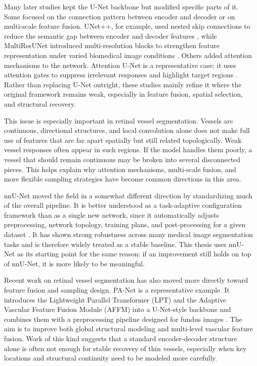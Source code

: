 \documentclass[a4paper,11pt]{article}
\begin{document}
Many later studies kept the U-Net backbone but modified specific parts of it. Some focused on the connection pattern between encoder and decoder or on multi-scale feature fusion. UNet++, for example, used nested skip connections to reduce the semantic gap between encoder and decoder features \cite{zhou2018unetpp}, while MultiResUNet introduced multi-resolution blocks to strengthen feature representation under varied biomedical image conditions \cite{ibtehaz2020multiresunet}. Others added attention mechanisms to the network. Attention U-Net is a representative case; it uses attention gates to suppress irrelevant responses and highlight target regions \cite{oktay2018attentionunet}. Rather than replacing U-Net outright, these studies mainly refine it where the original framework remains weak, especially in feature fusion, spatial selection, and structural recovery.

This issue is especially important in retinal vessel segmentation. Vessels are continuous, directional structures, and local convolution alone does not make full use of features that are far apart spatially but still related topologically. Weak vessel responses often appear in such regions. If the model handles them poorly, a vessel that should remain continuous may be broken into several disconnected pieces. This helps explain why attention mechanisms, multi-scale fusion, and more flexible sampling strategies have become common directions in this area.

nnU-Net moved the field in a somewhat different direction by standardizing much of the overall pipeline. It is better understood as a task-adaptive configuration framework than as a single new network, since it automatically adjusts preprocessing, network topology, training plans, and post-processing for a given dataset \cite{isensee2021nnunet}. It has shown strong robustness across many medical image segmentation tasks and is therefore widely treated as a stable baseline. This thesis uses nnU-Net as its starting point for the same reason: if an improvement still holds on top of nnU-Net, it is more likely to be meaningful.

Recent work on retinal vessel segmentation has also moved more directly toward feature fusion and sampling design. PA-Net is a representative example. It introduces the Lightweight Parallel Transformer (LPT) and the Adaptive Vascular Feature Fusion Module (AFFM) into a U-Net-style backbone and combines them with a preprocessing pipeline designed for fundus images \cite{luo2025panet}. The aim is to improve both global structural modeling and multi-level vascular feature fusion. Work of this kind suggests that a standard encoder-decoder structure alone is often not enough for stable recovery of thin vessels, especially when key locations and structural continuity need to be modeled more carefully.
\end{document}
